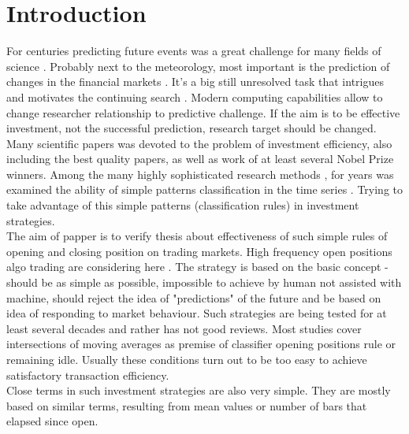 \documentclass{tewiart}
\begin{document}
\section{Introduction}
\indent For centuries predicting future events was a great challenge for many fields of science \cite{ball07, wu12}. Probably next to the meteorology, most important is the prediction of changes in the financial markets \cite{krutsinger99, satchwell05, schwager02}. It's a big still unresolved task that intrigues and motivates the continuing search \cite{fama91, fama98}. Modern computing capabilities allow to change researcher relationship to predictive challenge. If the aim is to be effective investment, not the successful prediction, research target should be changed. Many scientific papers was devoted to the problem of investment efficiency, also including the best quality papers, as well as work of at least several Nobel Prize winners. Among the many highly sophisticated research methods \cite{fujimoto03, kompa08, pawlak02, pedrycz97, rua09, raghuraj09, wilinski09} , for years was examined the ability of simple patterns classification in the time series \cite{brock92, cai05, gencay99, lebaron99, satchwell05}. Trying to take advantage of this simple patterns (classification rules) in investment strategies.\\
\indent The aim of papper is to verify thesis about effectiveness of such simple rules of opening and closing position on trading markets. High frequency open positions algo trading are considering here \cite{muriel04}. The strategy is based on the basic concept - should be as simple as possible, impossible to achieve by human not assisted with machine, should reject the idea of "predictions" of the future and be based on idea of responding to market behaviour. Such strategies are being tested for at least several decades and rather has not good reviews. Most studies cover intersections of moving averages as premise of classifier opening positions rule or remaining idle. Usually these conditions turn out to be too easy to achieve satisfactory transaction efficiency.\\
\indent Close terms in such investment strategies are also very simple. They are mostly based on similar terms, resulting from mean values or number of bars that elapsed since open.
\end{document}

